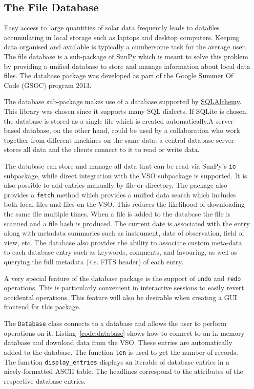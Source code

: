 \subsection{The File Database}\label{ssec:db}

Easy access to large quantities of solar data frequently leads to datafiles accumulating
in local storage such as laptops and desktop computers. Keeping data organised and available
is typically a cumbersome task for the average user. The file database is a sub-package of 
SunPy which is meant to solve this problem by providing a unified database to store and manage information about 
local data files. The database package was developed as part of the Google 
Summer Of Code (GSOC) program 2013.

The database sub-package makes use of a database supported by
\href{http://www.sqlalchemy.org}{SQLAlchemy}. This library was chosen
since it supports many SQL dialects. 
If SQLite is chosen, the database is stored as a single file which is
created automatically.A server-based database, on the other hand, could be used 
by a collaboration who work together from different machines on the
same data: a central database server stores all data and the clients connect to
it to read or write data.

The database can store and manage all data that can be read via SunPy's 
\texttt{io} subpackage, while direct integration with the \textsc{VSO} 
subpackage is supported.
It is also possible to add entries manually by file or directory. The package also provides
a \texttt{fetch} method which provides a unified data search which includes both local files
and files on the \textsc{VSO}. This reduces the likelihood of downloading the same file 
multiple times. When a file is added to the database the file is scanned and a file hash is produced. 
The current date is associated with the entry along with metadata summaries such 
as instrument, date of observation, field of view, etc. 
The database also provides the ability to associate custom meta-data to 
each database entry such as keywords, comments, and favouring, as well as 
querying the full metadata (\textit{i.e.} FITS header) of each entry.

A very special feature of the database package is the support of \texttt{undo}
and \texttt{redo} operations. This is particularly convenient in
interactive sessions to easily revert accidental operations. 
This feature will also be desirable when creating a GUI frontend for this package.

The \texttt{Database} class connects to a database and allows the user to 
perform operations on it. Listing~\ref{code:database} shows how to connect
to an in-memory database and download data from the \textsc{VSO}. These entries are
automatically added to the database. The function \texttt{len} is used to get the number of
records. The function \texttt{display\_entries} displays an iterable of 
database entries in a nicely-formatted \textsc{ASCII} table. The headlines 
correspond to the attributes of the respective database entries.

